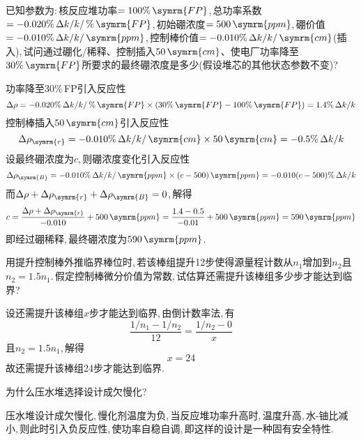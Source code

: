 \begin{exercise}
    已知参数为:\,核反应堆功率$=100\%\,\symrm{FP}$,\,总功率系数$ = -0.020\%\,\Delta k/k/\,\%\,\symrm{FP}$,\,初始硼浓度$=500\,\symrm{ppm}$,\,硼价值$=-0.010\%\,\Delta k/k/\,\symrm{ppm}$,\,控制棒价值$ = -0.010\%\,\Delta k/k/\,\symrm{cm}$(插入),\,试问通过硼化/稀释、控制插入$50\,\symrm{cm}$、使电厂功率降至$30\%\,\symrm{FP}$所要求的最终硼浓度是多少(假设堆芯的其他状态参数不变)?\,
    \begin{solution}
        功率降至30\%\,FP引入反应性
        \begin{equation*}
            \Delta\rho = -0.020\%\,\Delta k/k/\,\%\,\symrm{FP} \times \left(30\%\,\symrm{FP} - 100\%\,\symrm{FP}\right) = 1.4\%\,\Delta k/k
        \end{equation*}
        控制棒插入$50\,\symrm{cm}$引入反应性
        \begin{equation*}
            \Delta\rho_{\symrm{r}} = -0.010\%\,\Delta k/k/\,\symrm{cm} \times 50\,\symrm{cm} = -0.5\%\,\Delta k/k
        \end{equation*}
        设最终硼浓度为$c$,\,则硼浓度变化引入反应性
        \begin{equation*}
            \Delta\rho_{\symrm{B}} = -0.010\%\,\Delta k/k/\,\symrm{ppm} \times (c-500)\,\symrm{ppm} = -0.010(c-500)\%\,\Delta k/k
        \end{equation*}
        而$\Delta\rho + \Delta\rho_{\symrm{r}} + \Delta\rho_{\symrm{B}} = 0$,\,解得
        \begin{equation*}
            c = \frac{\Delta\rho + \Delta\rho_{\symrm{r}}}{-0.010} + 500\,\symrm{ppm} = \frac{1.4 - 0.5}{-0.01} + 500\,\symrm{ppm} = 590\,\symrm{ppm}
        \end{equation*}
        即经过硼稀释,\,最终硼浓度为$590\,\symrm{ppm}$.\,
    \end{solution}
\end{exercise}

\begin{exercise}
    用提升控制棒外推临界棒位时,\,若该棒组提升12步使得源量程计数从$n_1$增加到$n_2$且$n_2 = 1.5 n_1$.\,假定控制棒微分价值为常数,\,试估算还需提升该棒组多少步才能达到临界?\,
    \begin{solution}
        设还需提升该棒组$x$步才能达到临界,\,由倒计数率法,\,有
        \begin{equation*}
            \frac{1/n_1 - 1/n_2}{12} = \frac{1/n_2 - 0}{x}
        \end{equation*}
        且$n_2 = 1.5 n_1$,\,解得
        \begin{equation*}
            x = 24
        \end{equation*}
        故还需提升该棒组24步才能达到临界.\,
    \end{solution}
\end{exercise}

\begin{exercise}
    为什么压水堆选择设计成欠慢化?\,
    \begin{solution}
        压水堆设计成欠慢化,\,慢化剂温度为负,\,当反应堆功率升高时,\,温度升高,\,水-铀比减小,\,则此时引入负反应性,\,使功率自稳自调,\,即这样的设计是一种固有安全特性.\,
    \end{solution}
\end{exercise}